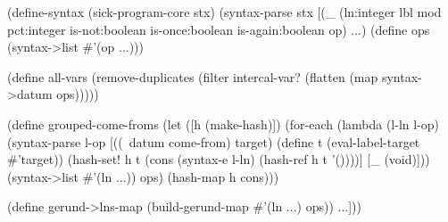 \begin{CodeBlock}
(define-syntax (sick-program-core stx)
  (syntax-parse stx
    [(_ (ln:integer lbl mod pct:integer
         is-not:boolean is-once:boolean is-again:boolean op) ...)
     (define ops (syntax->list #'(op ...)))

     (define all-vars
       (remove-duplicates
        (filter intercal-var?
                (flatten (map syntax->datum ops)))))

     (define grouped-come-froms
       (let ([h (make-hash)])
         (for-each
          (lambda (l-ln l-op)
            (syntax-parse l-op
              [((~datum come-from) target)
               (define t (eval-label-target #'target))
               (hash-set! h t (cons (syntax-e l-ln)
                                    (hash-ref h t '())))]
              [_ (void)]))
          (syntax->list #'(ln ...)) ops)
         (hash-map h cons)))

     (define gerund->lns-map
       (build-gerund-map #'(ln ...) ops))
     ...]))
\end{CodeBlock}
